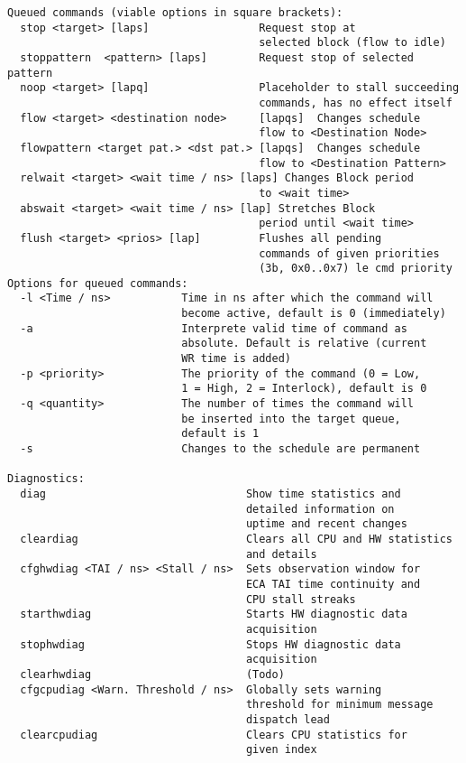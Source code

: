 \begin{lstlisting}[style = helptext]
Queued commands (viable options in square brackets):
  stop <target> [laps]                 Request stop at
                                       selected block (flow to idle)
  stoppattern  <pattern> [laps]        Request stop of selected pattern
  noop <target> [lapq]                 Placeholder to stall succeeding
                                       commands, has no effect itself
  flow <target> <destination node>     [lapqs]  Changes schedule
                                       flow to <Destination Node>
  flowpattern <target pat.> <dst pat.> [lapqs]  Changes schedule
                                       flow to <Destination Pattern>
  relwait <target> <wait time / ns> [laps] Changes Block period
                                       to <wait time>
  abswait <target> <wait time / ns> [lap] Stretches Block
                                       period until <wait time>
  flush <target> <prios> [lap]         Flushes all pending
                                       commands of given priorities
                                       (3b, 0x0..0x7) le cmd priority
Options for queued commands:
  -l <Time / ns>           Time in ns after which the command will
                           become active, default is 0 (immediately)
  -a                       Interprete valid time of command as
                           absolute. Default is relative (current
                           WR time is added)
  -p <priority>            The priority of the command (0 = Low,
                           1 = High, 2 = Interlock), default is 0
  -q <quantity>            The number of times the command will
                           be inserted into the target queue,
                           default is 1
  -s                       Changes to the schedule are permanent

Diagnostics:
  diag                               Show time statistics and
                                     detailed information on
                                     uptime and recent changes
  cleardiag                          Clears all CPU and HW statistics
                                     and details
  cfghwdiag <TAI / ns> <Stall / ns>  Sets observation window for
                                     ECA TAI time continuity and
                                     CPU stall streaks
  starthwdiag                        Starts HW diagnostic data
                                     acquisition
  stophwdiag                         Stops HW diagnostic data
                                     acquisition
  clearhwdiag                        (Todo)
  cfgcpudiag <Warn. Threshold / ns>  Globally sets warning
                                     threshold for minimum message
                                     dispatch lead
  clearcpudiag                       Clears CPU statistics for
                                     given index
\end{lstlisting}

